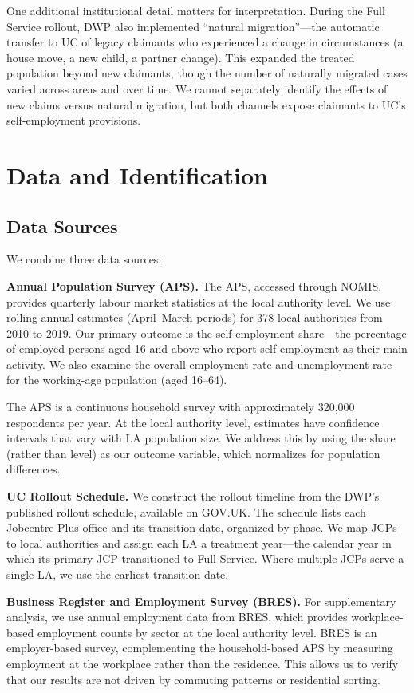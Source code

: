 \documentclass[12pt]{article}
\begin{document}
One additional institutional detail matters for interpretation. During the Full Service rollout, DWP also implemented ``natural migration''---the automatic transfer to UC of legacy claimants who experienced a change in circumstances (a house move, a new child, a partner change). This expanded the treated population beyond new claimants, though the number of naturally migrated cases varied across areas and over time. We cannot separately identify the effects of new claims versus natural migration, but both channels expose claimants to UC's self-employment provisions.


\section{Data and Identification}

\subsection{Data Sources}

We combine three data sources:

\textbf{Annual Population Survey (APS).} The APS, accessed through NOMIS, provides quarterly labour market statistics at the local authority level. We use rolling annual estimates (April--March periods) for 378 local authorities from 2010 to 2019. Our primary outcome is the self-employment share---the percentage of employed persons aged 16 and above who report self-employment as their main activity. We also examine the overall employment rate and unemployment rate for the working-age population (aged 16--64).

The APS is a continuous household survey with approximately 320,000 respondents per year. At the local authority level, estimates have confidence intervals that vary with LA population size. We address this by using the share (rather than level) as our outcome variable, which normalizes for population differences.

\textbf{UC Rollout Schedule.} We construct the rollout timeline from the DWP's published rollout schedule, available on GOV.UK. The schedule lists each Jobcentre Plus office and its transition date, organized by phase. We map JCPs to local authorities and assign each LA a treatment year---the calendar year in which its primary JCP transitioned to Full Service. Where multiple JCPs serve a single LA, we use the earliest transition date.

\textbf{Business Register and Employment Survey (BRES).} For supplementary analysis, we use annual employment data from BRES, which provides workplace-based employment counts by sector at the local authority level. BRES is an employer-based survey, complementing the household-based APS by measuring employment at the workplace rather than the residence. This allows us to verify that our results are not driven by commuting patterns or residential sorting.
\end{document}
